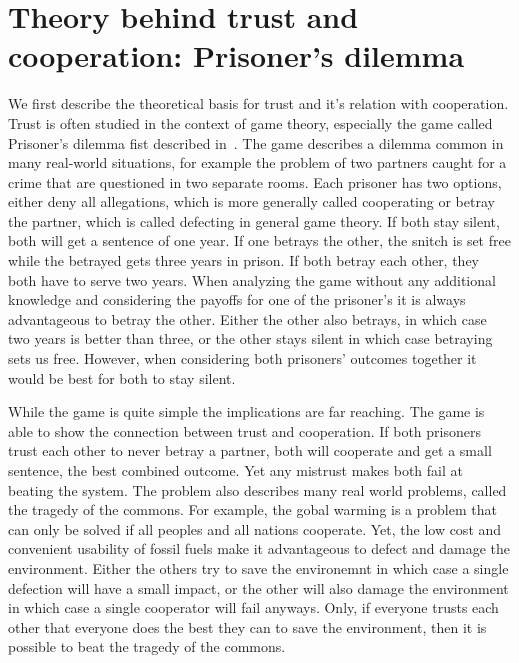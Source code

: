 \section{Theory behind trust and cooperation: Prisoner's dilemma}
We first describe the theoretical basis for trust and it's relation with cooperation. Trust is often
studied in the context of game theory, especially the game called Prisoner's dilemma fist described
in~\cite{chammah1965prisoner}. The game describes a dilemma common in many real-world situations, for
example the problem of two partners caught for a crime that are questioned in two separate rooms. 
Each prisoner has two options, either deny all allegations, which is more generally called cooperating
 or betray the partner, which is called defecting in general game theory. If both stay 
silent, both will get a sentence of one year. If one betrays the other, the snitch is set free while the 
betrayed gets three years in prison. If both betray each other, they both have to serve two years.
When analyzing the game without any additional knowledge and considering the payoffs for one of the
prisoner's it is always advantageous to betray the other. Either the other also betrays, in which case
two years is better than three, or the other stays silent in which case betraying sets us free. 
However, when considering both prisoners' outcomes together it would be best for both to stay silent.


While the game is quite simple the implications are far reaching. The game is able to show the 
connection between trust and cooperation. If both prisoners trust each other to never betray a 
partner, both will cooperate and get a small sentence, the best combined outcome. Yet any mistrust
makes both fail at beating the system. The problem also describes many real world problems, called 
the tragedy of the commons. For example, the gobal warming is a problem that can only be solved if
all peoples and all nations cooperate. Yet, the low cost and convenient usability of fossil fuels 
make it advantageous to defect and damage the environment. Either the others try to save the environemnt
in which case a single defection will have a small impact, or the other will also damage the environment
in which case a single cooperator will fail anyways. Only, if everyone trusts each other that
everyone does the best they can to save the environment, then it is possible to beat the tragedy 
of the commons.

